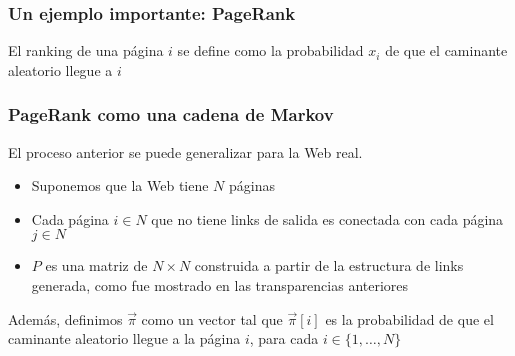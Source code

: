\begin{frame}
\frametitle{Un ejemplo importante: PageRank}

{\small

El ranking de una página $i$ se define como la probabilidad $x_i$ de que el caminante aleatorio llegue a $i$
\begin{itemize}
\end{itemize}





}

\end{frame}

\begin{frame}
\frametitle{PageRank como una cadena de Markov}

{\small

El proceso anterior se puede generalizar para la Web real.
\begin{itemize}
\item Suponemos que la Web tiene $N$ páginas

\item Cada página $i \in N$ que no tiene links de salida es conectada con cada página $j \in N$

\item $P$ es una matriz de $N \times N$ construida a partir de la estructura de links generada, como fue mostrado en las transparencias anteriores
\end{itemize}


Además, definimos $\vec \pi$ como un vector tal que $\vec \pi[i]$ es la probabilidad de que el caminante aleatorio llegue a la página $i$, para cada $i \in \{1, \ldots, N\}$

}



\end{frame}


